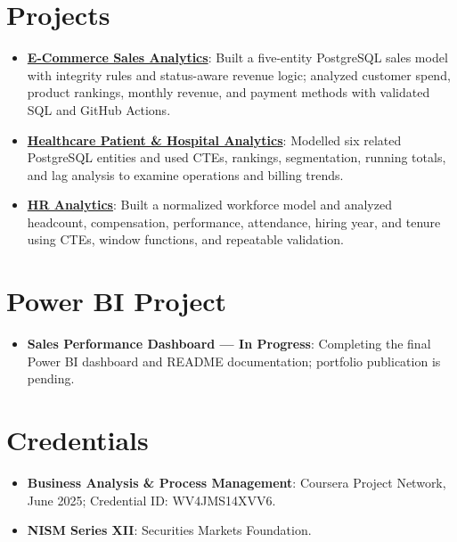 \documentclass[letterpaper,11pt]{article}
\newcommand{\resumeProject}[2]{
  \item\small{\textbf{#1}: #2\vspace{-2pt}}
}
\newcommand{\resumeSubHeadingListStart}{\begin{itemize}[leftmargin=*]}
\newcommand{\resumeSubHeadingListEnd}{\end{itemize}}
\begin{document}
\section{Projects}
\resumeSubHeadingListStart
  \resumeProject{\href{https://github.com/jainalimehta/Ecommerce-Sales-Analytics}{E-Commerce Sales Analytics}}{Built a five-entity PostgreSQL sales model with integrity rules and status-aware revenue logic; analyzed customer spend, product rankings, monthly revenue, and payment methods with validated SQL and GitHub Actions.}
  \resumeProject{\href{https://github.com/jainalimehta/Healthcare-Analytics}{Healthcare Patient \& Hospital Analytics}}{Modelled six related PostgreSQL entities and used CTEs, rankings, segmentation, running totals, and lag analysis to examine operations and billing trends.}
  \resumeProject{\href{https://github.com/jainalimehta/HR-Analytics}{HR Analytics}}{Built a normalized workforce model and analyzed headcount, compensation, performance, attendance, hiring year, and tenure using CTEs, window functions, and repeatable validation.}
\resumeSubHeadingListEnd

\section{Power BI Project}
\resumeSubHeadingListStart
  \resumeProject{Sales Performance Dashboard --- In Progress}{Completing the final Power BI dashboard and README documentation; portfolio publication is pending.}
\resumeSubHeadingListEnd

\section{Credentials}
\resumeSubHeadingListStart
  \resumeProject{Business Analysis \& Process Management}{Coursera Project Network, June 2025; Credential ID: WV4JMS14XVV6.}
  \resumeProject{NISM Series XII}{Securities Markets Foundation.}
\resumeSubHeadingListEnd
\end{document}

